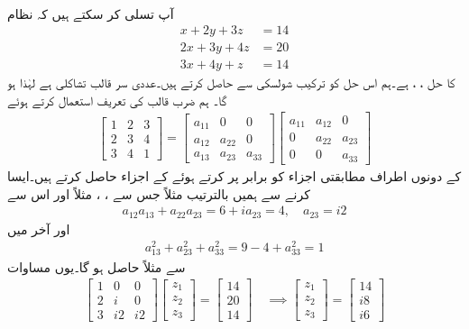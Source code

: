 \quad {}\\
آپ تسلی کر سکتے ہیں کہ نظام
\begin{align*}
x+2y+3z&=14\\
2x+3y+4z&=20\\
3x+4y+z&=14
\end{align*}
کا حل ، ،  ہے۔ہم اس حل کو ترکیب شولسکی سے حاصل کرتے ہیں۔عددی سر قالب تشاکلی ہے لہٰذا   ہو گا۔ ہم ضرب قالب کی تعریف استعمال کرتے ہوئے
\begin{align*}
\begin{bmatrix}
1&2&3\\
2&3&4\\
3&4&1
\end{bmatrix}=
\begin{bmatrix}
a_{11}&0&0\\
a_{12}&a_{22}&0\\
a_{13}&a_{23}&a_{33}
\end{bmatrix}
\begin{bmatrix}
a_{11}&a_{12}&0\\
0&a_{22}&a_{23}\\
0&0&a_{33}
\end{bmatrix}
\end{align*}
کے دونوں اطراف مطابقتی اجزاء کو برابر پر کرتے ہوئے   کے اجزاء حاصل کرتے ہیں۔ایسا کرنے سے ہمیں  بالترتیب  مثلاً  جس سے ، ،  مثلاً
  اور اس سے
\begin{align*}
a_{12}a_{13}+a_{22}a_{23}=6+ia_{23}=4,\quad a_{23}=i2
\end{align*}
اور آخر میں
\begin{align*}
a^2_{13}+a^2_{23}+a^2_{33}=9-4+a^2_{33}=1
\end{align*}
سے مثلاً  حاصل ہو گا۔یوں مساوات 
\begin{align*}
\begin{bmatrix}
1&0&0\\
2&i&0\\
3&i2&i2
\end{bmatrix}
\begin{bmatrix}
z_1\\
z_2\\
z_3
\end{bmatrix}=
\begin{bmatrix}
14\\
20\\
14
\end{bmatrix}\quad\implies
\begin{bmatrix}
z_1\\
z_2\\
z_3
\end{bmatrix}=
\begin{bmatrix}
14\\
i8\\
i6
\end{bmatrix}
\end{align*}
